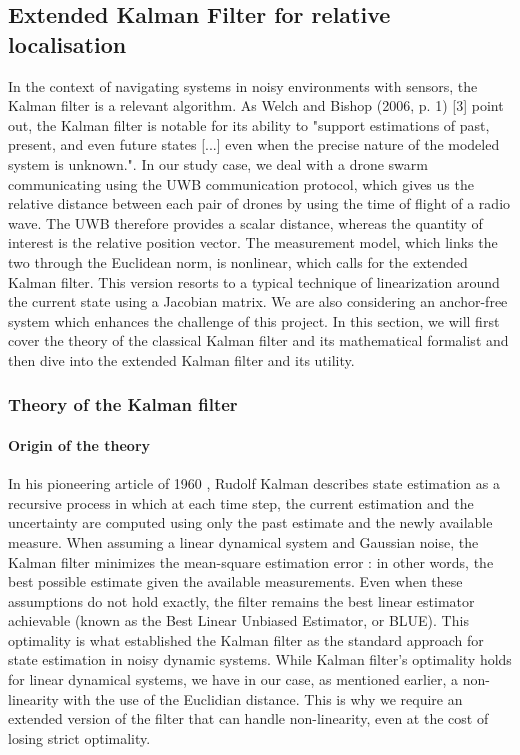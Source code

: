 \subsection{Extended Kalman Filter for relative localisation  }
In the context of navigating systems in noisy environments with sensors, the Kalman filter is a relevant algorithm. As Welch and Bishop (2006, p. 1) [3] point out, the Kalman filter is notable for its ability to "support estimations of past, present, and even future states [...] even when the precise nature of the modeled system is unknown.". In our study case, we deal with a drone swarm communicating using the UWB communication protocol, which gives us the relative distance between each pair of drones by using the time of flight of a radio wave. The UWB therefore provides a scalar distance, whereas the quantity of interest is the relative position vector. The measurement model, which links the two through the Euclidean norm, is nonlinear, which calls for the extended Kalman filter. This version resorts to a typical technique of linearization around the current state using a Jacobian matrix. We are also considering an anchor-free system which enhances the challenge of this project. In this section, we will first cover the theory of the classical Kalman filter and its mathematical formalist and then dive into the extended Kalman filter and its utility.


\subsubsection{Theory of the Kalman filter}

\paragraph{Origin of the theory}

In his pioneering article of 1960 \parencite{kalman1960}, 
Rudolf Kalman describes state estimation as a recursive process in which at each time step, 
the current estimation and the uncertainty are computed using only the past estimate and the newly available measure. When assuming a linear dynamical system and Gaussian noise, the Kalman filter minimizes the mean-square estimation error : in other words, the best possible estimate given the available measurements. Even when these assumptions do not hold exactly, the filter remains the best linear estimator achievable (known as the Best Linear Unbiased Estimator, or BLUE). This optimality is what established the Kalman filter as the standard approach for state estimation in noisy dynamic systems. While Kalman filter's optimality holds for linear dynamical systems, we have in our case, as mentioned earlier, a non-linearity with the use of the Euclidian distance. This is why we require an extended version of the filter that can handle non-linearity, even at the cost of losing strict optimality.


